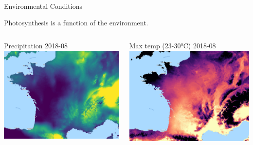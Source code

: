 \documentclass[11pt]{beamer}
\begin{document}
%
%		
%		
	
	\begin{frame}{Environmental Conditions}
		
				
		{
			Photosynthesis is a function of the environment.
		}
	
		\vspace{1cm}
		
		\begin{columns}[t]
			Precipitation 2018-08
			\includegraphics[width=\textwidth]{images/france_pr_201808}
			
				Max temp (23-30°C) 2018-08
				\includegraphics[width=\textwidth]{images/france_tmmx_201808}
			
		\end{columns}

	\end{frame}
	
\end{document}
